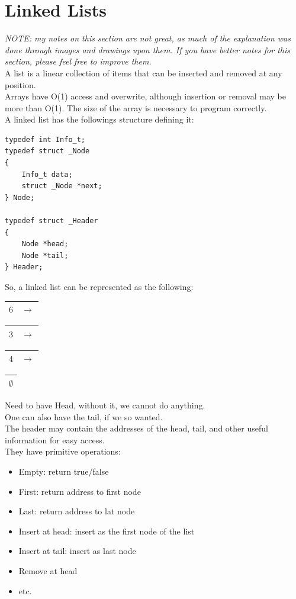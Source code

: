 \documentclass[nobib]{tufte-handout}
\begin{document}
\section{Linked Lists}
\textit{NOTE: my notes on this section are not great, as much of the explanation was done through images and drawings upon them. If you have better notes for this section, please feel free to improve them.}\\
A list is a linear collection of items that can be inserted and removed at any position.\\
Arrays have O(1) access and overwrite, although insertion or removal may be more than O(1). The size of the array is necessary to program correctly.\\
A linked list has the followings structure defining it:
\begin{lstlisting}
typedef int Info_t;
typedef struct _Node
{
    Info_t data;
    struct _Node *next;
} Node;

typedef struct _Header
{
    Node *head;
    Node *tail;
} Header;
\end{lstlisting}
So, a linked list can be represented as the following:\\
\begin{table}
    \centering
    \begin{tabular}{|c|c|}
        \hline
        $6$ & $\rightarrow$ \\
        \hline
    \end{tabular}
    \begin{tabular}{|c|c|}
        \hline
        $3$ & $\rightarrow$ \\
        \hline
    \end{tabular}
    \begin{tabular}{|c|c|}
        \hline
        $4$ & $\rightarrow$ \\
        \hline
    \end{tabular}
    \begin{tabular}{|c|}
        \hline
        $\emptyset$ \\
        \hline
    \end{tabular}
\end{table}
Need to have Head, without it, we cannot do anything.\\
One can also have the tail, if we so wanted.\\
The header may contain the addresses of the head, tail, and other useful information for easy access.\\
They have primitive operations:
\begin{itemize}
    \item Empty: return true/false
    \item First: return address to first node
    \item Last: return address to lat node
    \item Insert at head: insert as the first node of the list
    \item Insert at tail: insert as last node
    \item Remove at head
    \item etc.
\end{itemize}
\end{document}

